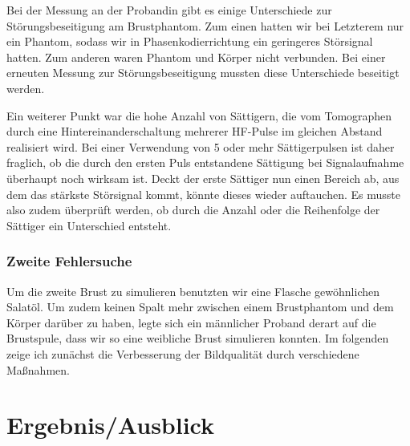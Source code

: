 \documentclass[
    11pt,
    ngerman
]{scrreprt}
\begin{document}
Bei der Messung an der Probandin gibt es einige Unterschiede zur
Störungsbeseitigung am Brustphantom. Zum einen hatten wir bei Letzterem nur
ein Phantom, sodass wir in Phasenkodierrichtung ein geringeres Störsignal
hatten. Zum anderen waren Phantom und Körper nicht verbunden.
Bei einer erneuten Messung zur Störungsbeseitigung mussten
diese Unterschiede beseitigt werden. 

Ein weiterer Punkt war die hohe Anzahl von Sättigern, die vom Tomographen
durch eine Hintereinanderschaltung mehrerer HF-Pulse im gleichen Abstand
realisiert wird. Bei einer Verwendung von 5 oder mehr Sättigerpulsen ist daher
fraglich, ob die durch den ersten Puls entstandene Sättigung bei
Signalaufnahme überhaupt noch wirksam ist. Deckt der erste Sättiger nun einen
Bereich ab, aus dem das stärkste Störsignal kommt, könnte dieses wieder
auftauchen. Es musste also zudem überprüft werden, ob durch die Anzahl oder die
Reihenfolge der Sättiger ein Unterschied entsteht.

\subsection{Zweite Fehlersuche}

Um die zweite Brust zu simulieren benutzten wir eine Flasche gewöhnlichen Salatöl. Um zudem keinen Spalt mehr zwischen einem Brustphantom und dem Körper darüber zu haben, legte sich ein männlicher Proband derart auf die Brustspule, dass wir so eine weibliche Brust simulieren konnten. Im folgenden zeige ich zunächst die Verbesserung der Bildqualität durch verschiedene Maßnahmen.




    \chapter{Ergebnis/Ausblick}

    
\end{document}

